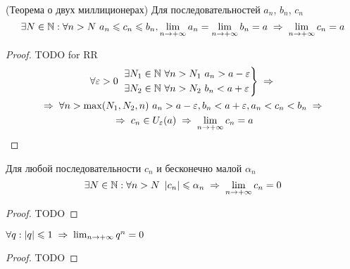 \begin{theorem}
    (Теорема о двух миллиционерах) Для последовательностей $a_n$, $b_n$, $c_n$
    \[ \exists N \in \N: \forall n > N\ a_n \le c_n \le b_n, \limpinf a_n = \limpinf b_n = a \thus \limpinf c_n = a \]
\end{theorem}
\begin{proof}
    TODO for RR
    \begin{multline*}
        \forall \varepsilon > 0\ 
        \begin{rcases}
            \exists N_1 \in \N\ \forall n > N_1\ a_n > a - \varepsilon \\
            \exists N_2 \in \N\ \forall n > N_2\ b_n < a + \varepsilon
        \end{rcases} \thus \\
        \thus \forall n > \max(N_1, N_2, n)\ a_n > a - \varepsilon, b_n < a + \varepsilon, a_n < c_n < b_n \thus \\
        \thus c_n \in U_\varepsilon(a) \thus
        \limpinf c_n = a
    \end{multline*}
\end{proof}

\begin{theorem}
    Для любой последовательности $c_n$ и бесконечно малой $\alpha_n$ 
    \[ \exists N \in \N: \forall n > N\ \abs{c_n} \le \alpha_n \thus \limpinf c_n = 0 \]
\end{theorem}
\begin{proof}
    TODO
\end{proof}

\begin{theorem}
    $\forall q : \abs{q} \le 1 \thus \limpinf{q^n} = 0$
\end{theorem}
\begin{proof}
    TODO
\end{proof}



